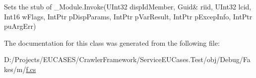 Sets the stub of \-\_\-\-Module.\-Invoke(U\-Int32 disp\-Id\-Member, Guid\& riid, U\-Int32 lcid, Int16 w\-Flags, Int\-Ptr p\-Disp\-Params, Int\-Ptr p\-Var\-Result, Int\-Ptr p\-Excep\-Info, Int\-Ptr pu\-Arg\-Err)



The documentation for this class was generated from the following file\-:\begin{DoxyCompactItemize}
\item 
D\-:/\-Projects/\-E\-U\-C\-A\-S\-E\-S/\-Crawler\-Framework/\-Service\-E\-U\-Cases.\-Test/obj/\-Debug/\-Fakes/m/\hyperlink{m_2f_8cs}{f.\-cs}\end{DoxyCompactItemize}
